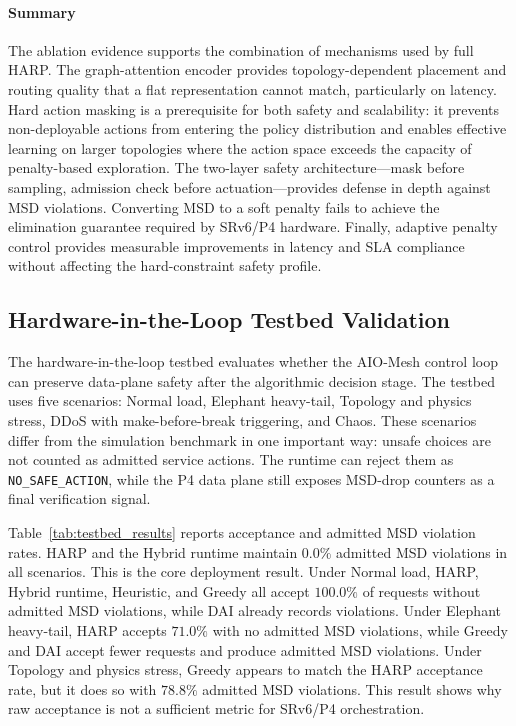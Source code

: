\documentclass[final,5p]{elsarticle}
\begin{document}
\paragraph{Summary}
The ablation evidence supports the combination of mechanisms used by full HARP. The graph-attention encoder provides topology-dependent placement and routing quality that a flat representation cannot match, particularly on latency. Hard action masking is a prerequisite for both safety and scalability: it prevents non-deployable actions from entering the policy distribution and enables effective learning on larger topologies where the action space exceeds the capacity of penalty-based exploration. The two-layer safety architecture---mask before sampling, admission check before actuation---provides defense in depth against MSD violations. Converting MSD to a soft penalty fails to achieve the elimination guarantee required by SRv6/P4 hardware. Finally, adaptive penalty control provides measurable improvements in latency and SLA compliance without affecting the hard-constraint safety profile.

\subsection{Hardware-in-the-Loop Testbed Validation}
\label{subsec:testbed_validation}

The hardware-in-the-loop testbed evaluates whether the AIO-Mesh control loop can preserve data-plane safety after the algorithmic decision stage. The testbed uses five scenarios: Normal load, Elephant heavy-tail, Topology and physics stress, DDoS with make-before-break triggering, and Chaos. These scenarios differ from the simulation benchmark in one important way: unsafe choices are not counted as admitted service actions. The runtime can reject them as \texttt{NO\_SAFE\_ACTION}, while the P4 data plane still exposes MSD-drop counters as a final verification signal.

Table~\ref{tab:testbed_results} reports acceptance and admitted MSD violation rates. HARP and the Hybrid runtime maintain \(0.0\%\) admitted MSD violations in all scenarios. This is the core deployment result. Under Normal load, HARP, Hybrid runtime, Heuristic, and Greedy all accept \(100.0\%\) of requests without admitted MSD violations, while DAI already records violations. Under Elephant heavy-tail, HARP accepts \(71.0\%\) with no admitted MSD violations, while Greedy and DAI accept fewer requests and produce admitted MSD violations. Under Topology and physics stress, Greedy appears to match the HARP acceptance rate, but it does so with \(78.8\%\) admitted MSD violations. This result shows why raw acceptance is not a sufficient metric for SRv6/P4 orchestration.
\end{document}
